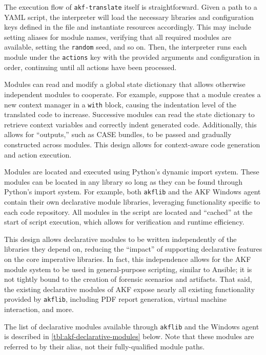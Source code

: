 \documentclass[letterpaper,12pt]{report}
\newcommand{\passthrough}[1]{#1}
\begin{document}
The execution flow of \passthrough{\lstinline!akf-translate!} itself is
straightforward. Given a path to a YAML script, the interpreter will
load the necessary libraries and configuration keys defined in the file
and instantiate resources accordingly. This may include setting aliases
for module names, verifying that all required modules are available,
setting the \passthrough{\lstinline!random!} seed, and so on. Then, the
interpreter runs each module under the \passthrough{\lstinline!actions!}
key with the provided arguments and configuration in order, continuing
until all actions have been processed.

Modules can read and modify a global state dictionary that allows
otherwise independent modules to cooperate. For example, suppose that a
module creates a new context manager in a \passthrough{\lstinline!with!}
block, causing the indentation level of the translated code to increase.
Successive modules can read the state dictionary to retrieve context
variables and correctly indent generated code. Additionally, this allows
for ``outputs,'' such as CASE bundles, to be passed and gradually
constructed across modules. This design allows for context-aware code
generation and action execution.

Modules are located and executed using Python's dynamic import system.
These modules can be located in any library so long as they can be found
through Python's import system. For example, both
\passthrough{\lstinline!akflib!} and the AKF Windows agent contain their
own declarative module libraries, leveraging functionality specific to
each code repository. All modules in the script are located and
``cached'' at the start of script execution, which allows for
verification and runtime efficiency.

This design allows declarative modules to be written independently of
the libraries they depend on, reducing the ``impact'' of supporting
declarative features on the core imperative libraries. In fact, this
independence allows for the AKF module system to be used in
general-purpose scripting, similar to Ansible; it is not tightly bound
to the creation of forensic scenarios and artifacts. That said, the
existing declarative modules of AKF expose nearly all existing
functionality provided by \passthrough{\lstinline!akflib!}, including
PDF report generation, virtual machine interaction, and more.

The list of declarative modules available through
\passthrough{\lstinline!akflib!} and the Windows agent is described in
\autoref{tbl:akf-declarative-modules} below. Note that these modules are
referred to by their alias, not their fully-qualified module paths.
\end{document}
